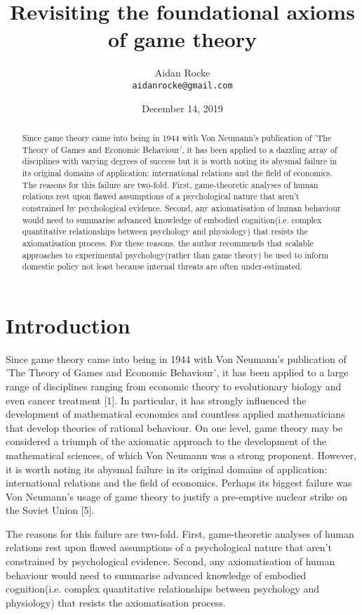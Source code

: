 \documentclass{article}
\title{Revisiting the foundational axioms of game theory}
\date{December 14, 2019}
\author{%
  Aidan Rocke\\
  \texttt{aidanrocke@gmail.com} \\
}
\begin{document}
\maketitle

\begin{abstract}
   Since game theory came into being in 1944 with Von Neumann's publication of 'The Theory of Games and Economic Behaviour', it has been applied to a dazzling array of disciplines with varying degrees of success but it is worth noting its abysmal failure in its original domains of application: international relations and the field of economics. The reasons for this failure are two-fold. First, game-theoretic analyses of human relations rest upon flawed assumptions of a psychological nature that aren't constrained by psychological evidence. Second, any axiomatisation of human behaviour would need to summarise advanced knowledge of embodied cognition(i.e. complex quantitative relationships between psychology and physiology) that resists the axiomatisation process. For these reasons, the author recommends that scalable approaches to experimental psychology(rather than game theory) be used to inform domestic policy not least because internal threats are often under-estimated. 
\end{abstract}

\section{Introduction}

Since game theory came into being in 1944 with Von Neumann's publication of 'The Theory of Games and Economic Behaviour', it has been applied to a large range of disciplines ranging from economic theory to evolutionary biology and even cancer treatment [1]. In particular, it has strongly influenced the development of mathematical economics and countless applied mathematicians that develop theories of rational behaviour. On one level, game theory may be considered a triumph of the axiomatic approach to the development of the mathematical sciences, of which Von Neumann was a strong proponent. However, it is worth noting its abysmal failure in its original domains of application: international relations and the field of economics. Perhaps its biggest failure was Von Neumann's usage of game theory to justify a pre-emptive nuclear strike on the Soviet Union [5]. 

	The reasons for this failure are two-fold. First, game-theoretic analyses of human relations rest upon flawed assumptions of a psychological nature that aren't constrained by psychological evidence. Second, any axiomatisation of human behaviour would need to summarise advanced knowledge of embodied cognition(i.e. complex quantitative relationships between psychology and physiology) that resists the axiomatisation process. 
	
\end{document}
